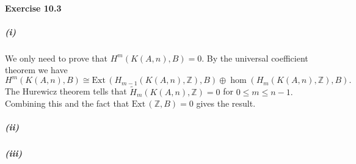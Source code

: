 \documentclass{article}
\begin{document}
\paragraph{Exercise 10.3}
\subparagraph{(i)}We only need to prove that $H^m(K(A,n),B)=0.$ By the universal coefficient theorem we have
\[H^m(K(A,n),B)\cong\text{Ext}\,(H_{m-1}(K(A,n),\mathbb{Z}),B)\oplus\hom(H_m(K(A,n),\mathbb{Z}),B).\]
The Hurewicz theorem tells that $\tilde{H}_{m}(K(A,n),\mathbb{Z})=0$ for $0\leq m\leq n-1.$ Combining this and the fact that $\text{Ext}\,(\mathbb{Z},B)=0$ gives the result.

\subparagraph{(ii)}

\subparagraph{(iii)}
\end{document}
